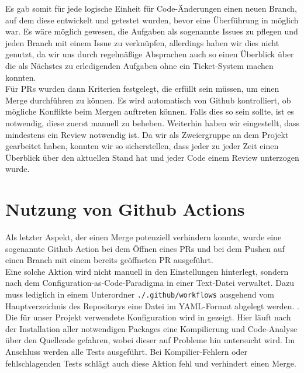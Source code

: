 Es gab somit für jede logische Einheit für Code-Änderungen einen neuen Branch, auf dem diese entwickelt und getestet
wurden, bevor eine Überführung in  möglich war.
Es wäre möglich gewesen, die Aufgaben als sogenannte Issues zu pflegen und jeden Branch mit einem Issue zu verknüpfen,
allerdings haben wir dies nicht genutzt, da wir uns durch regelmäßige Absprachen auch so einen Überblick über die
als Nächstes zu erledigenden Aufgaben ohne ein Ticket-System machen konnten. \\

Für \ac{PR}s wurden dann Kriterien festgelegt, die erfüllt sein müssen, um einen Merge durchführen zu können.
Es wird automatisch von Github kontrolliert, ob mögliche Konflikte beim Mergen auftreten können.
Falls dies so sein sollte, ist es notwendig, diese zuerst manuell zu beheben.
Weiterhin haben wir eingestellt, dass mindestens ein Review notwendig ist.
Da wir als Zweiergruppe an dem Projekt gearbeitet haben, konnten wir so sicherstellen, dass jeder zu jeder Zeit einen
Überblick über den aktuellen Stand hat und jeder Code einem Review unterzogen wurde.

\section{Nutzung von Github Actions}
\label{sec:github-actions}

Als letzter Aspekt, der einen Merge potenziell verhindern konnte, wurde eine sogenannte Github Action bei dem Öffnen
eines \ac{PR}s und bei dem Pushen auf einen Branch mit einem bereits geöffneten \ac{PR} ausgeführt. \\

Eine solche Aktion wird nicht manuell in den Einstellungen hinterlegt, sondern nach dem
Configuration-as-Code-Paradigma in einer Text-Datei verwaltet.
Dazu muss lediglich in einem Unterordner \texttt{./.github/workflows} ausgehend vom Hauptverzeichnis des Repositorys
eine Datei im YAML-Format abgelegt werden.  . \\

Die für unser Projekt verwendete Konfiguration wird in  gezeigt.
Hier läuft nach der Installation aller notwendigen Packages eine Kompilierung und Code-Analyse über den
Quellcode gefahren, wobei dieser auf Probleme hin untersucht wird.
Im Anschluss werden alle Tests ausgeführt.
Bei Kompilier-Fehlern oder fehlschlagenden Tests schlägt auch diese Aktion fehl und verhindert einen Merge. \\

